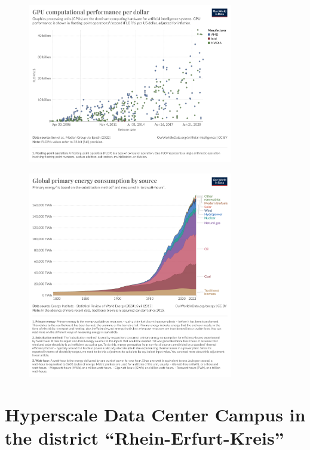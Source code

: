 \documentclass{article}
\begin{document}
\begin{figure}[H]
    \includegraphics[width=0.8\textwidth]{gpu-price-performance.png}
\end{figure}

\begin{figure}[H]
    \includegraphics[width=0.8\textwidth]{global-energy-substitution.png}
\end{figure}

\section{Hyperscale Data Center Campus in the district “Rhein-Erfurt-Kreis”}
\end{document}
